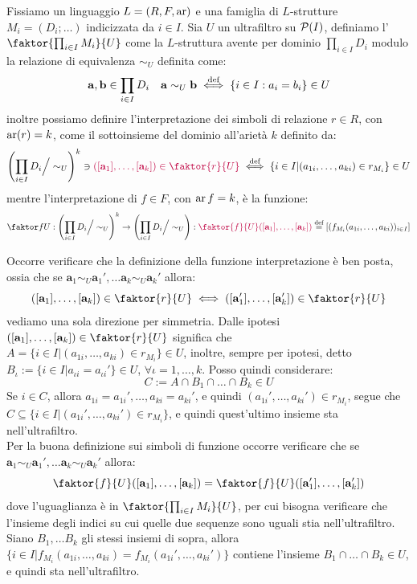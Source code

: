 \begin{definition}
    [Ultraprodotto]
    Fissiamo un linguaggio $L = (R,F,\operatorname{ar})$ e una famiglia di $L$-strutture $M_i = (D_i;\ldots)$ indicizzata da $i \in I$. Sia $U$ un ultrafiltro su $\mathcal{P}(I)$, definiamo l' $\faktor{\prod_{i \in I} M_i}{U}$
    come la $L$-struttura avente per dominio $\prod_{i \in I}D_i$ modulo la relazione di equivalenza $\sim_U$ definita come:
    \[ \mathbf a,\mathbf b \in \prod_{i \in I} D_i \quad \mathbf a \sim_U \mathbf b \overset{\text{def}}{\iff} \{ i \in I : a_i = b_i \} \in U
    \]
    inoltre possiamo definire l'interpretazione dei simboli di relazione $r \in R$, con $\operatorname{ar}(r) = k$, come il sottoinsieme del dominio all'arietà $k$ definito da:
    \[ \left(\prod_{i \in I}D_i \Big/\sim_U\right)^k\ni \purple{([\mathbf a_1],\ldots,[\mathbf a_{k}]) \in \faktor{r}{U}} \defiff \{i \in I | (a_{1i},\ldots,a_{ki}) \in r_{M_i}\} \in U
    \]
    mentre l'interpretazione di $f \in F$, con $\operatorname{ar} f = k$, è la funzione:
    \[ \faktor fU : \left(\prod_{i \in I}D_i \Big/\sim_U\right)^k \to \left(\prod_{i \in I}D_i \Big/\sim_U\right) : \purple{\faktor{f}{U}([\mathbf a_1],\ldots,[\mathbf a_k])} \overset{\text{def}}{=} [(f_{M_i}(a_{1i},\ldots,a_{ki}))_{i \in I}]
    \]
\end{definition}

\begin{remark}
    Occorre verificare che la definizione della funzione interpretazione è ben posta,
    ossia che se $\mathbf a_1 \sim_U \mathbf a_1',\ldots \mathbf a_k \sim_U \mathbf a_k'$ allora:
    \[ ([\mathbf a_1],\ldots,[\mathbf a_k]) \in \faktor{r}{U} \iff ([\mathbf a_1'],\ldots,[\mathbf a_k']) \in \faktor{r}{U}
    \]
    vediamo una sola direzione per simmetria. Dalle ipotesi $([\mathbf a_1],\ldots,[\mathbf a_k]) \in \faktor{r}{U}$ significa che $A = \{ i \in I | (a_{1i},\ldots,a_{ki}) \in r_{M_i}\} \in U$, inoltre, sempre per ipotesi,
    detto $B_\iota := \{ i \in I | a_{\iota i} = a_{\iota i}'\} \in U$, $\forall \iota = 1,\ldots,k$. Posso quindi considerare:
    \[ C := A \cap B_1 \cap \ldots \cap B_k \in U
    \]
    Se $i \in C$, allora $a_{1i} = a_{1i}',\ldots,a_{ki} = a_{ki}'$, e quindi $(a_{1i}',\ldots,a_{ki}') \in r_{M_i}$, segue che $C \subseteq \{ i \in I | (a_{1i}',\ldots,a_{ki}') \in r_{M_i}\}$, e quindi quest'ultimo insieme sta nell'ultrafiltro.\\
    Per la buona definizione sui simboli di funzione occorre verificare che se $\mathbf a_1 \sim_U \mathbf a_1',\ldots \mathbf a_k \sim_U \mathbf a_k'$ allora:
    \[ \faktor{f}{U}([\mathbf a_1],\ldots,[\mathbf a_k]) = \faktor{f}{U}([\mathbf a_1'],\ldots,[\mathbf a_k']) \]
    dove l'uguaglianza è in $\faktor{\prod_{i \in I} M_i}{U}$, per cui bisogna verificare che l'insieme degli indici su cui quelle due sequenze sono uguali stia nell'ultrafiltro.
    Siano $B_1,\ldots B_k$ gli stessi insiemi di sopra, allora $\{ i \in I | f_{M_i}(a_{1i},\ldots,a_{ki}) = f_{M_i}(a_{1i}',\ldots,a_{ki}')\}$ contiene l'insieme $B_1 \cap \ldots \cap B_k \in U$, e quindi sta nell'ultrafiltro.    
\end{remark}

